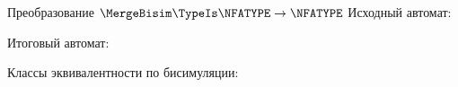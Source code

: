 \begin{frame}{Преобразование $\MergeBisim\TypeIs\NFATYPE\to\NFATYPE$} %
	Исходный автомат:


	Итоговый автомат:


	Классы эквивалентности по бисимуляции:



\end{frame}
